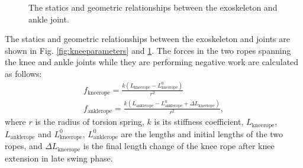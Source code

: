 \documentclass[10pt]{asme2ej}
\begin{document}
\begin{figure}[t]
	\caption{The statics and geometric relationships between the exoskeleton and ankle joint.}
	\label{fig:ankleparameters}
\end{figure}


The statics and geometric relationships between the exoskeleton and joints are shown in Fig. \ref{fig:kneeparameters} and \ref{fig:ankleparameters}.
The forces in the two ropes spanning the knee and ankle joints while they are performing negative work are calculated as follows:
\begin{gather}
	f_\mathrm{kneerope} = \frac{k(L_\mathrm{kneerope}-L_\mathrm{kneerope}^0)}{r^2} \\
	f_\mathrm{anklerope} = \frac{k(L_\mathrm{anklerope}-L_\mathrm{anklerope}^0+\Delta L_\mathrm{kneerope})}{r^2},
\end{gather}
where $r$ is the radius of torsion spring, $k$ is its stiffness coefficient, $L_\mathrm{kneerope}$, $L_\mathrm{anklerope}$ and $L_\mathrm{kneerope}^0$, $L_\mathrm{anklerope}^0$ are the lengths and initial lengths of the two ropes, and $\Delta L_\mathrm{kneerope}$ is the final length change of the knee rope after knee extension in late swing phase.
\end{document}
